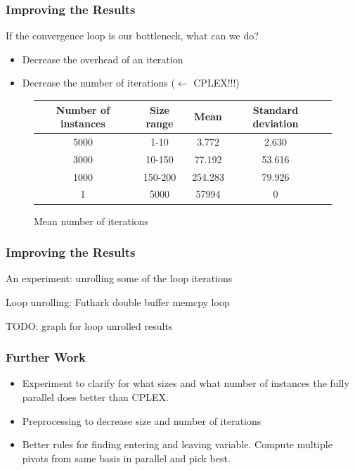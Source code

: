\documentclass[handout]{beamer}
\begin{document}
\begin{frame}
\frametitle{Improving the Results}

If the convergence loop is our bottleneck, what can we do?

\begin{itemize}
\item Decrease the overhead of an iteration
\item Decrease the number of iterations ($\leftarrow$ CPLEX!!!)
\end{itemize}

\begin{figure}
\begin{tabular}{|c|c|c|c|c|}
\hline
\textbf{Number of instances} & \textbf{Size range} & \textbf{Mean} & \textbf{Standard deviation} \\\hline
5000 & 1-10 & 3.772 & 2.630 \\\hline
3000 & 10-150 & 77.192 & 53.616 \\\hline
1000 & 150-200 & 254.283 & 79.926 \\\hline
1 & 5000 & 57994 & 0 \\\hline
\end{tabular}
\caption{Mean number of iterations}
\end{figure}
\end{frame}

\begin{frame}
\frametitle{Improving the Results}
An experiment: unrolling some of the loop iterations

Loop unrolling: Futhark double buffer memcpy loop

TODO: graph for loop unrolled results
\end{frame}


\begin{frame}
\frametitle{Further Work}
\begin{itemize}
	\item Experiment to clarify for what sizes and what number of instances the fully parallel does better than CPLEX.
	\item Preprocessing to decrease size and number of iterations
	\item Better rules for finding entering and leaving variable. Compute multiple pivots from same basis in parallel and pick best.
\end{itemize}
\end{frame}
\end{document}
